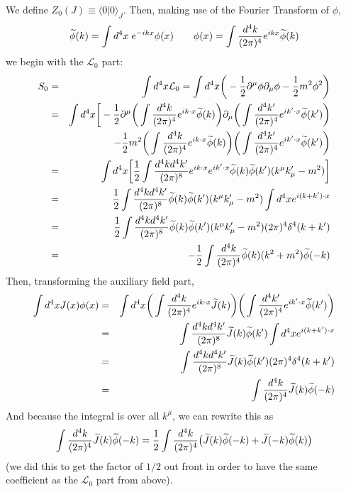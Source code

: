 \documentclass[12pt,epsf]{article}
\def\nolabel{\nonumber }
\def\nolabel{\nonumber }
\begin{document}
We define $Z_0(J) \equiv \langle 0 | 0 \rangle_J$.  Then, making use of
the Fourier Transform of $\phi$, 
\begin{eqnarray}
\widetilde{\phi}(k) = \int d^4x \; e^{-ikx}\phi(x) \qquad \phi(x) =
\int {d^4k \over (2\pi)^4} e^{ikx} \widetilde{\phi}(k)\nolabel
\end{eqnarray}
we begin with the $\mathcal{L}_0$ part:
\begin{eqnarray}
S_0 &=& \int d^4x \mathcal{L}_0 = \int d^4x \bigg(-{1\over 2}
\partial^{\mu}\phi \partial_{\mu}\phi - {1\over 2}m^2\phi^2 \bigg)
\nolabel \\
&=& \int d^4x \bigg[-{1\over 2} \partial^{\mu}\bigg(\int {d^4k \over
(2\pi)^4} e^{ik\cdot x}\widetilde{\phi}(k)\bigg)
\partial_{\mu}\bigg(\int {d^4k' \over (2\pi)^4} e^{ik'\cdot x}
\widetilde{\phi}(k')\bigg) \nolabel \\
& & \qquad \quad \;\; -{1\over 2}m^2\bigg(\int {d^4k \over (2\pi)^4}
e^{ik\cdot x}\widetilde{\phi}(k)\bigg)\bigg(\int {d^4k' \over (2\pi)^4}
e^{ik'\cdot x} \widetilde{\phi}(k')\bigg) \nolabel \\
&=& \int d^4x \bigg[{1\over 2} \int {d^4kd^4k' \over (2\pi)^8}
e^{ik\cdot x}e^{ik'\cdot x} \widetilde{\phi}(k) \widetilde{\phi}(k')
(k^{\mu}k'_{\mu} - m^2)\bigg] \nolabel \\
&=& {1\over 2} \int {d^4k d^4k' \over (2\pi)^8} \widetilde{\phi}(k)
\widetilde{\phi}(k') (k^{\mu}k'_{\mu} - m^2)\int d^4xe^{i(k+k')\cdot x}
\nolabel \\
&=& {1\over 2}\int {d^4k d^4k' \over (2\pi)^8}\widetilde{\phi}(k)
\widetilde{\phi}(k') (k^{\mu}k'_{\mu} - m^2) (2\pi)^4 \delta^4(k+k')
\nolabel \\
&=& -{1\over 2} \int {d^4k \over (2\pi)^4} \widetilde{\phi}(k)
(k^2+m^2)\widetilde{\phi}(-k) \nolabel
\end{eqnarray}
Then, transforming the auxiliary field part,
\begin{eqnarray}
\int d^4x J(x) \phi(x) &=& \int d^4x\bigg(\int {d^4k \over (2\pi)^4}
e^{ik\cdot x}\widetilde{J}(k)\bigg)\bigg(\int {d^4k' \over (2\pi)^4}
e^{ik' \cdot x} \widetilde{\phi}(k')\bigg) \nolabel \\
&=& \int {d^4k d^4k' \over (2\pi)^8} \widetilde{J}(k)
\widetilde{\phi}(k') \int d^4x e^{i(k+k')\cdot x} \nolabel \\
&=& \int {d^4kd^4k' \over (2\pi)^8} \widetilde{J}(k)
\widetilde{\phi}(k') (2\pi)^4 \delta^4(k+k') \nolabel \\
&=& \int {d^4k \over (2\pi)^4} \widetilde{J}(k)
\widetilde{\phi}(-k)\nolabel
\end{eqnarray}
And because the integral is over all $k^{\mu}$, we can rewrite this as 
\begin{eqnarray}
\int {d^4k \over (2\pi)^4} \widetilde{J}(k) \widetilde{\phi}(-k) =
{1\over 2} \int {d^4k \over (2\pi)^4} \big(\widetilde{J}(k)
\widetilde{\phi}(-k) +
\widetilde{J}(-k)\widetilde{\phi}(k)\big)\nolabel
\end{eqnarray}
(we did this to get the factor of $1/2$ out front in order to have the
same coefficient as the $\mathcal{L}_0$ part from above).  
\end{document}
